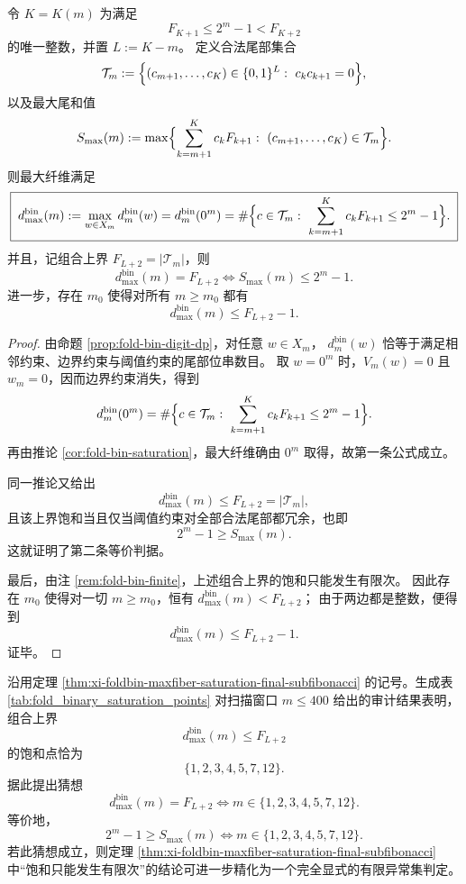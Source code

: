 \begin{theorem}\label{thm:xi-foldbin-maxfiber-saturation-final-subfibonacci}
令 \(K=K(m)\) 为满足
\[
F_{K+1}\le 2^m-1<F_{K+2}
\]
的唯一整数，并置 \(L:=K-m\)。
定义合法尾部集合
\[
\mathcal T_m
:=
\Bigl\{
(c_{m+1},\dots,c_K)\in\{0,1\}^{L}:\ c_kc_{k+1}=0
\Bigr\},
\]
以及最大尾和值
\[
S_{\max}(m)
:=
\max\Bigl\{
\sum_{k=m+1}^{K}c_kF_{k+1}:\ (c_{m+1},\dots,c_K)\in\mathcal T_m
\Bigr\}.
\]
则最大纤维满足
\[
\boxed{\;
d_{\max}^{\mathrm{bin}}(m)
:=
\max_{w\in X_m}d_m^{\mathrm{bin}}(w)
=
d_m^{\mathrm{bin}}(0^m)
=
\#\Bigl\{
c\in\mathcal T_m:\ \sum_{k=m+1}^{K}c_kF_{k+1}\le 2^m-1
\Bigr\}.\;}
\]
并且，记组合上界 \(F_{L+2}=|\mathcal T_m|\)，则
\[
\boxed{\;
d_{\max}^{\mathrm{bin}}(m)=F_{L+2}
\iff
S_{\max}(m)\le 2^m-1.\;}
\]
进一步，存在 \(m_0\) 使得对所有 \(m\ge m_0\) 都有
\[
\boxed{\;
d_{\max}^{\mathrm{bin}}(m)\le F_{L+2}-1.\;}
\]
\end{theorem}
\begin{proof}
由命题 \ref{prop:fold-bin-digit-dp}，对任意 \(w\in X_m\)，
\(
d_m^{\mathrm{bin}}(w)
\)
恰等于满足相邻约束、边界约束与阈值约束的尾部位串数目。
取 \(w=0^m\) 时，\(V_m(w)=0\) 且 \(w_m=0\)，因而边界约束消失，得到
\[
d_m^{\mathrm{bin}}(0^m)
=
\#\Bigl\{
c\in\mathcal T_m:\ \sum_{k=m+1}^{K}c_kF_{k+1}\le 2^m-1
\Bigr\}.
\]
再由推论 \ref{cor:fold-bin-saturation}，最大纤维确由 \(0^m\) 取得，故第一条公式成立。

同一推论又给出
\[
d_{\max}^{\mathrm{bin}}(m)\le F_{L+2}=|\mathcal T_m|,
\]
且该上界饱和当且仅当阈值约束对全部合法尾部都冗余，也即
\[
2^m-1\ge S_{\max}(m).
\]
这就证明了第二条等价判据。

最后，由注 \ref{rem:fold-bin-finite}，上述组合上界的饱和只能发生有限次。
因此存在 \(m_0\) 使得对一切 \(m\ge m_0\)，恒有
\(
d_{\max}^{\mathrm{bin}}(m)<F_{L+2}
\)；
由于两边都是整数，便得到
\[
d_{\max}^{\mathrm{bin}}(m)\le F_{L+2}-1.
\]
证毕。
\end{proof}

\begin{conjecture}\label{conj:xi-foldbin-maxfiber-saturation-sporadic-set}
沿用定理 \ref{thm:xi-foldbin-maxfiber-saturation-final-subfibonacci} 的记号。生成表
\ref{tab:fold_binary_saturation_points} 对扫描窗口 \(m\le 400\) 给出的审计结果表明，组合上界
\[
d_{\max}^{\mathrm{bin}}(m)\le F_{L+2}
\]
的饱和点恰为
\[
\{1,2,3,4,5,7,12\}.
\]
据此提出猜想
\[
\boxed{\;
d_{\max}^{\mathrm{bin}}(m)=F_{L+2}
\iff
m\in\{1,2,3,4,5,7,12\}.\;}
\]
等价地，
\[
\boxed{\;
2^m-1\ge S_{\max}(m)
\iff
m\in\{1,2,3,4,5,7,12\}.\;}
\]
若此猜想成立，则定理 \ref{thm:xi-foldbin-maxfiber-saturation-final-subfibonacci} 中“饱和只能发生有限次”的结论可进一步精化为一个完全显式的有限异常集判定。
\end{conjecture}

